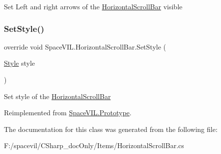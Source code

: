 Set Left and right arrows of the \mbox{\hyperlink{class_space_v_i_l_1_1_horizontal_scroll_bar}{Horizontal\+Scroll\+Bar}} visible 

\mbox{\label{class_space_v_i_l_1_1_horizontal_scroll_bar_ab871a5c2d291dadd8c902efd361079d5}} 
\subsubsection{\texorpdfstring{Set\+Style()}{SetStyle()}}
{\footnotesize\ttfamily override void Space\+V\+I\+L.\+Horizontal\+Scroll\+Bar.\+Set\+Style (\begin{DoxyParamCaption}\item[{\mbox{\hyperlink{class_space_v_i_l_1_1_decorations_1_1_style}{Style}}}]{style }\end{DoxyParamCaption})\hspace{0.3cm}{\ttfamily [virtual]}}



Set style of the \mbox{\hyperlink{class_space_v_i_l_1_1_horizontal_scroll_bar}{Horizontal\+Scroll\+Bar}} 



Reimplemented from \mbox{\hyperlink{class_space_v_i_l_1_1_prototype_ae96644a6ace490afb376fb542161e541}{Space\+V\+I\+L.\+Prototype}}.



The documentation for this class was generated from the following file\+:\begin{DoxyCompactItemize}
\item 
F\+:/spacevil/\+C\+Sharp\+\_\+doc\+Only/\+Items/Horizontal\+Scroll\+Bar.\+cs\end{DoxyCompactItemize}
